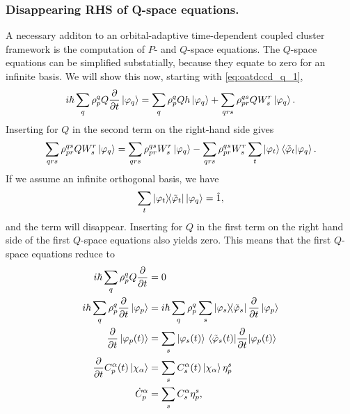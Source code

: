     \subsubsection{Disappearing RHS of Q-space equations.}

    A necessary additon to an orbital-adaptive time-dependent coupled cluster framework 
    is the computation of $P$- and $Q$-space equations. The $Q$-space equations can 
    be simplified substatially, because they equate to zero for an infinite basis. 
    We will show this now, starting with \autoref{eq:oatdccd_q_1},
    \begin{equation}
        i\hbar\sum_q \rho^q_p Q \frac{\partial}{\partial t} \ket{\varphi_q} 
        = \sum_q \rho^q_p Q h\ket{\varphi_q}
        + \sum_{qrs} \rho^{qs}_{pr} Q W^r_s \ket{\varphi_q}.
    \end{equation}
    Inserting for $Q$ in the second term on the right-hand side gives
    \begin{equation}
        \sum_{qrs} \rho^{qs}_{pr} Q W^r_s \ket{\varphi_q} 
        = \sum_{qrs} \rho^{qs}_{pr} W^r_s\ket{\varphi_q} 
        - \sum_{qrs} \rho^{qs}_{pr} W^r_s
            \sum_t \ket{\varphi_t}\braket{\tilde{\varphi}_t}{\varphi_q}.
    \end{equation}
    If we assume an infinite orthogonal basis, we have 
    \begin{equation*}
        \sum_t \dyad{\varphi_t}{\tilde{\varphi}_t}\ket{\varphi_q} = \hat{1},
    \end{equation*}
    and the term will disappear. Inserting for $Q$ in the first term on the 
    right hand side of the first $Q$-space equations also yields zero. This 
    means that the first $Q$-space equations reduce to 
    \begin{equation}
        \begin{aligned}
        i\hbar \sum_q \rho^q_p Q \frac{\partial}{\partial t} &= 0 \\
        i\hbar \sum_q \rho^q_p \frac{\partial}{\partial t} \ket{\varphi_p}
        &=
        i\hbar \sum_q \rho^q_p
            \sum_s \dyad{\varphi_s}{\tilde{\varphi}_s}\frac{\partial}{\partial t}
            \ket{\varphi_p} \\
        \frac{\partial}{\partial t}\ket{\varphi_p(t)}
        &=
        \sum_s \ket{\varphi_s(t)}
            \mel*{\tilde{\varphi}_s(t)}{\frac{\partial}{\partial t}}{\varphi_p(t)} \\
        \frac{\partial}{\partial t} C^\alpha_p(t) \ket{\chi_\alpha}
        &=
        \sum_s C^\alpha_s(t) \ket{\chi_\alpha} \eta^s_p \\
        \dot{C}^\alpha_p &= \sum_s C^\alpha_s \eta^s_p,
        \end{aligned}
    \end{equation}
